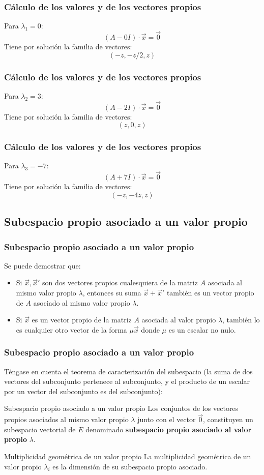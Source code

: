 \documentclass{beamer}
\begin{document}
\begin{frame}
\frametitle{C\'alculo de los valores y de los vectores propios}
Para $\lambda_1=0$:
\[(A-0I)\cdot \vec x = \vec 0\]
Tiene por soluci\'on la familia de vectores: 
\[(-z,-z/2,z)\]
\end{frame}


\begin{frame}
\frametitle{C\'alculo de los valores y de los vectores propios}
Para $\lambda_2=3$:
\[(A-2I)\cdot \vec x = \vec 0\]
Tiene por soluci\'on la familia de vectores: 
\[(z,0,z)\]
\end{frame}



\begin{frame}
\frametitle{C\'alculo de los valores y de los vectores propios}
Para $\lambda_3=-7$:
\[(A+7I)\cdot \vec x = \vec 0\]
Tiene por soluci\'on la familia de vectores: 
\[(-z,-4z,z)\]
\end{frame}



\subsection{Subespacio propio asociado a un valor propio}
\begin{frame}
\frametitle{Subespacio propio asociado a un valor propio}
Se puede demostrar que:
\begin{itemize}
\item Si $\vec x, \vec x'$ son dos vectores propios cualesquiera de la matriz $A$ asociada al mismo valor propio $\lambda$, entonces su suma $\vec x +\vec x'$ tambi\'en es un vector propio de $A$ asociado al mismo valor propio $\lambda$.
\item Si $\vec x$ es un vector propio de la matriz $A$ asociada al valor propio $\lambda$, tambi\'en lo es cualquier otro vector de la forma $\mu \vec x$ donde $\mu$ es un escalar no nulo.
\end{itemize}
\end{frame}

\begin{frame}
\frametitle{Subespacio propio asociado a un valor propio}
T\'engase en cuenta el teorema de caracterizaci\'on del subespacio (la suma de dos vectores del subconjunto pertenece al subconjunto, y el producto de un escalar por un vector del subconjunto es del subconjunto):
\begin{block}{Subespacio propio asociado a un valor propio}
Los conjuntos de los vectores propios asociados al mismo valor propio $\lambda$ junto con el vector $\vec 0$, constituyen un subespacio vectorial de $E$ denominado \textbf{subespacio propio asociado al valor propio} $\lambda$.
\end{block}

\begin{block}{Multiplicidad geom\'etrica de un valor propio}
La multiplicidad geom\'etrica de un valor propio $\lambda_i$ es la dimensi\'on de su subespacio propio asociado.
\end{block}

\end{frame}
\end{document}
